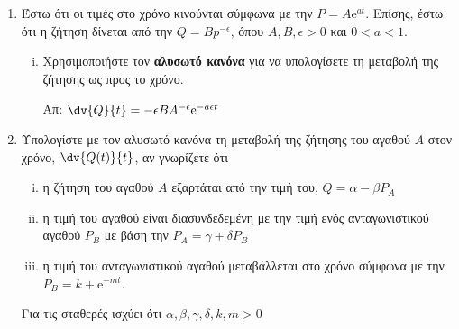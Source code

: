 \begin{enumerate}
  \item Έστω ότι οι τιμές στο χρόνο κινούνται σύμφωνα με την $ P= A \mathrm{e}^{at} $. 
    Επίσης, έστω ότι η ζήτηση δίνεται από την $ Q = Bp^{- \epsilon} $, όπου $ A,B,
    \epsilon > 0 $ και $ 0<a<1 $. 
    \begin{enumerate}[i)]
      \item Χρησιμοποιήστε τον \textbf{αλυσωτό κανόνα} για να υπολογίσετε
        τη μεταβολή της ζήτησης ως προς το χρόνο.

        \hfill Απ: $ \dv{Q}{t} = - \epsilon BA^{- \epsilon} \mathrm{e}^{-a\epsilon t} $ 

        \end{enumerate}

      \item Υπολογίστε με τον αλυσωτό κανόνα τη μεταβολή της ζήτησης του αγαθού $A$ στον
        χρόνο, $ \dv{Q(t)}{t} $, αν γνωρίζετε ότι 
        \begin{enumerate}[i)]
          \item η ζήτηση του αγαθού $A$ εξαρτάται από την τιμή του, $ Q= \alpha -
            \beta P_{A} $
          \item η τιμή του αγαθού είναι διασυνδεδεμένη με την τιμή ενός ανταγωνιστικού
            αγαθού $ P_{B} $ με βάση την $ P_{A}= \gamma + \delta P_{B} $
          \item η τιμή του ανταγωνιστικού αγαθού μεταβάλλεται στο χρόνο σύμφωνα με την 
            $ P_{B}=k + \mathrm{e}^{-mt} $. 
    \end{enumerate}

        Για τις σταθερές ισχύει ότι $ \alpha, \beta , \gamma , \delta , k , m >0 $
\end{enumerate}


\begin{center}
  \minibox{\large\bfseries \textcolor{Col1}{Ελαστικότητα}}
\end{center}

\vspace{\baselineskip}


